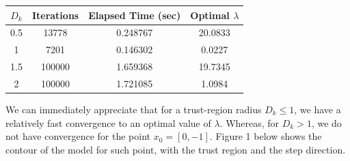 \documentclass[a4paper,11pt]{article}
\begin{document}
\begin{center}
	\begin{tabular}{||c | c | c | c |||} 
		\hline
		$D_{k}$ & Iterations & Elapsed Time (sec) & Optimal $\lambda$ \\ [0.5ex] 
		\hline\hline
		0.5 & 13778 & 0.248767 & 20.0833\\ 
		\hline
		1 & 7201 & 0.146302 & 0.0227\\
		\hline
		1.5 & 100000 & 1.659368 & 19.7345\\
		\hline
		2 & 100000 & 1.721085 & 1.0984\\
		\hline
	\end{tabular}
\end{center}

We can immediately appreciate that for a trust-region radius $D_{k}\leq{1}$, we have a relatively fast convergence to an optimal value of $\lambda$. Whereas, for $D_{k}>1$, we do not have convergence for the point $x_{0}=[0,-1]$. Figure 1 below shows the contour of the model for such point, with the trust region and the step direction.
\end{document}

